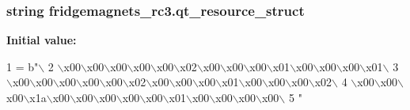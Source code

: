 \subsubsection[{qt\+\_\+resource\+\_\+struct}]{\setlength{\rightskip}{0pt plus 5cm}string fridgemagnets\+\_\+rc3.\+qt\+\_\+resource\+\_\+struct}\label{namespacefridgemagnets__rc3_aa52bfccb9a33fe2d3a9fc5a556766c30}
{\bfseries Initial value\+:}
\begin{DoxyCode}
1 = b\textcolor{stringliteral}{"\(\backslash\)}
2 \textcolor{stringliteral}{\(\backslash\)x00\(\backslash\)x00\(\backslash\)x00\(\backslash\)x00\(\backslash\)x00\(\backslash\)x02\(\backslash\)x00\(\backslash\)x00\(\backslash\)x00\(\backslash\)x01\(\backslash\)x00\(\backslash\)x00\(\backslash\)x00\(\backslash\)x01\(\backslash\)}
3 \textcolor{stringliteral}{\(\backslash\)x00\(\backslash\)x00\(\backslash\)x00\(\backslash\)x00\(\backslash\)x00\(\backslash\)x02\(\backslash\)x00\(\backslash\)x00\(\backslash\)x00\(\backslash\)x01\(\backslash\)x00\(\backslash\)x00\(\backslash\)x00\(\backslash\)x02\(\backslash\)}
4 \textcolor{stringliteral}{\(\backslash\)x00\(\backslash\)x00\(\backslash\)x00\(\backslash\)x1a\(\backslash\)x00\(\backslash\)x00\(\backslash\)x00\(\backslash\)x00\(\backslash\)x00\(\backslash\)x01\(\backslash\)x00\(\backslash\)x00\(\backslash\)x00\(\backslash\)x00\(\backslash\)}
5 \textcolor{stringliteral}{"}
\end{DoxyCode}
